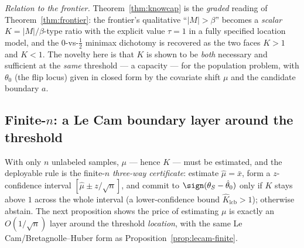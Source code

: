\smallskip\noindent\emph{Relation to the frontier.}
Theorem~\ref{thm:knowcap} is the \emph{graded} reading of
Theorem~\ref{thm:frontier}: the frontier's qualitative ``$|M|>\beta$'' becomes a
\emph{scalar} $K=|M|/\beta$-type ratio with the explicit value $\tau=1$ in a fully
specified location model, and the $0$-vs-$\tfrac12$ minimax dichotomy is recovered
as the two faces $K>1$ and $K<1$. The novelty here is that $K$ is shown to be
\emph{both} necessary and sufficient at the \emph{same} threshold --- a capacity ---
for the population problem, with $\theta_0$ (the flip locus) given in closed form by
the covariate shift $\mu$ and the candidate boundary $a$.

\subsection{Finite-$n$: a Le Cam boundary layer around the threshold}\label{sec:knowcap-finiten}
With only $n$ unlabeled samples, $\mu$ --- hence $K$ --- must be estimated, and the
deployable rule is the finite-$n$ \emph{three-way certificate}: estimate
$\hat\mu=\bar x$, form a $z$-confidence interval $[\hat\mu\pm z/\sqrt n]$, and commit
to $\sign(\theta_S-\hat\theta_0)$ only if $K$ stays above $1$ across the whole
interval (a lower-confidence bound $\hat K_{\mathrm{lcb}}>1$); otherwise abstain.
The next proposition shows the price of estimating $\mu$ is exactly an
$O(1/\sqrt n)$ layer around the threshold \emph{location}, with the same Le
Cam/Bretagnolle--Huber form as Proposition~\ref{prop:lecam-finite}.

